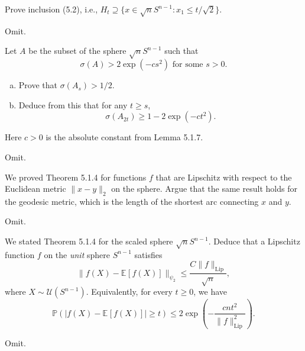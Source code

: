 \begin{problem*}[Exercise 5.1.8]\label{ex5.1.8}
	Prove inclusion (5.2), i.e., \(H_t \supseteq \{ x \in \sqrt{n} S^{n-1} \colon x_1 \leq t / \sqrt{2}  \} \).
\end{problem*}
\begin{answer}
	Omit.
\end{answer}

\begin{problem*}[Exercise 5.1.9]\label{ex5.1.9}
	Let \(A\) be the subset of the sphere \(\sqrt{n} S^{n-1}\) such that
	\[
		\sigma (A)
		> 2 \exp (-cs^2) \text{ for some } s > 0.
	\]
	\begin{enumerate}[(a)]
		\item\label{ex5.1.9:a} Prove that \(\sigma (A_s) > 1 / 2\).
		\item\label{ex5.1.9:b} Deduce from this that for any \(t \geq s\),
		      \[
			      \sigma (A_{2t})
			      \geq 1 - 2 \exp (-ct^2).
		      \]
	\end{enumerate}
	Here \(c > 0\) is the absolute constant from Lemma 5.1.7.
\end{problem*}
\begin{answer}
	Omit.
\end{answer}

\begin{problem*}[Exercise 5.1.11]\label{ex5.1.11}
	We proved Theorem 5.1.4 for functions \(f\) that are Lipschitz with respect to the Euclidean metric \(\lVert x - y \rVert _2\) on the sphere. Argue that the same result holds for the geodesic metric, which is the length of the shortest arc connecting \(x\) and \(y\).
\end{problem*}
\begin{answer}
	Omit.
\end{answer}

\begin{problem*}[Exercise 5.1.12]\label{ex5.1.12}
	We stated Theorem 5.1.4 for the scaled sphere \(\sqrt{n} S^{n-1}\). Deduce that a Lipschitz function \(f\) on the \emph{unit} sphere \(S^{n-1}\) satisfies
	\[
		\lVert f(X) - \mathbb{E}_{}[f(X)] \rVert _{\psi _2}
		\leq \frac{C \lVert f \rVert _{\mathrm{Lip} }}{\sqrt{n} },
	\]
	where \(X \sim \mathcal{U} (S^{n-1})\). Equivalently, for every \(t \geq 0\), we have
	\[
		\mathbb{P} \left( \lvert f(X) - \mathbb{E}_{}[f(X)] \rvert \geq t \right)
		\leq 2 \exp (- \frac{cnt^2}{\lVert f \rVert _{\mathrm{Lip} }^2}).
	\]
\end{problem*}
\begin{answer}
	Omit.
\end{answer}

